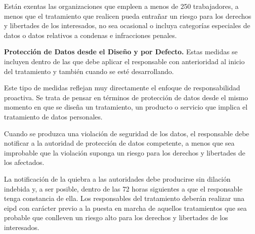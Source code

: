 Están exentas las organizaciones que empleen a menos de 250 trabajadores, a menos que el tratamiento que realicen pueda entrañar un riesgo para los derechos y libertades de los interesados, no sea ocasional o incluya categorías especiales de datos o datos relativos a condenas e infracciones penales.

\textbf{Protección de Datos desde el Diseño y por Defecto.} Estas medidas se incluyen dentro de las que debe aplicar el responsable con anterioridad al inicio del tratamiento y también cuando se esté desarrollando.

Este tipo de medidas reflejan muy directamente el enfoque de responsabilidad proactiva. Se trata de pensar en términos de protección de datos desde el mismo momento en que se diseña un tratamiento, un producto o servicio que implica el tratamiento de datos personales.

Cuando se produzca una violación de seguridad de los datos, el responsable debe notificar a la autoridad de protección de datos competente, a menos que sea improbable que la violación suponga un riesgo para los derechos y libertades de los afectados.

La notificación de la quiebra a las autoridades debe producirse sin dilación indebida y, a ser posible, dentro de las 72 horas siguientes a que el responsable tenga constancia de ella. Los responsables del tratamiento deberán realizar una \gls{eipd} con carácter previo a la puesta en marcha de aquellos tratamientos que sea probable que conlleven un riesgo alto para los derechos y libertades de los interesados.
